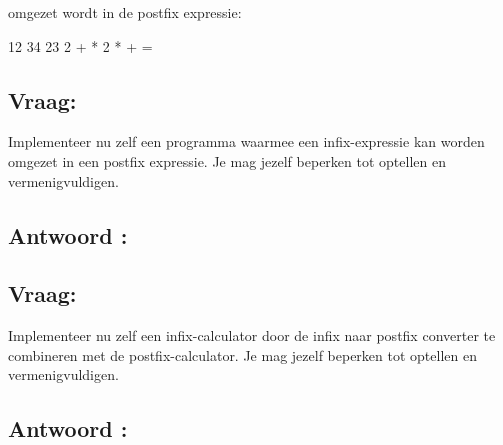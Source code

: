 \begin{cpplstShortInline}
omgezet wordt in de postfix expressie:

\begin{coutput}
12 34 23 2 + * 2 * + =
\end{coutput}


\subsection*{Vraag:}
Implementeer nu zelf een programma waarmee een infix-expressie kan worden omgezet in een postfix expressie.
Je mag jezelf beperken tot optellen en vermenigvuldigen.

\subsection*{Antwoord :}
\vspace{-.4\baselineskip}

\subsection*{Vraag:}
Implementeer nu zelf een infix-calculator door de infix naar postfix converter te combineren met de postfix-calculator.
Je mag jezelf beperken tot optellen en vermenigvuldigen.

\subsection*{Antwoord :}
\vspace{-.4\baselineskip}


\end{cpplstShortInline}
